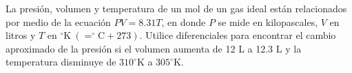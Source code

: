 \item La presión, volumen y temperatura de un mol de un gas ideal están relacionados por medio de la ecuación $PV = 8.31T$, en donde $P$ se mide en kilopascales, $V$ en litros y $T$ en $^\circ\text{K} \ (= ^\circ\text{C} + 273)$. Utilice diferenciales para encontrar el cambio aproximado de la presión si el volumen aumenta de 12 L a 12.3 L y la temperatura disminuye de $310^\circ\text{K}$ a $305^\circ\text{K}$.
